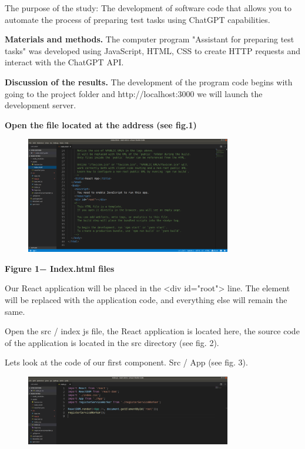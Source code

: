 The purpose of the study: The development of software code that allows
you to automate the process of preparing test tasks using ChatGPT
capabilities.

{\bfseries Materials and methods.} The computer program "Assistant for
preparing test tasks" was developed using JavaScript, HTML, CSS to
create HTTP requests and interact with the ChatGPT API.

{\bfseries Discussion of the results.} The development of the program code
begins with going to the project folder and http://localhost:3000 we
will launch the development server.

{\bfseries Open the file located at the address (see fig.1)}

\begin{figure}[H]
	\centering
	\includegraphics[width=0.8\textwidth]{assets/126}
	\caption*{}
\end{figure}

{\bfseries Figure 1− Index.html files}

Our React application will be placed in the \textless div
id="root"\textgreater{} line. The element will be replaced with the
application code, and everything else will remain the same.

Open the src / index js file, the React application is located here, the
source code of the application is located in the src directory (see fig.
2).

Let\textquotesingle s look at the code of our first component. Src / App
(see fig. 3).

\begin{figure}[H]
	\centering
	\includegraphics[width=0.8\textwidth]{assets/127}
	\caption*{}
\end{figure}

